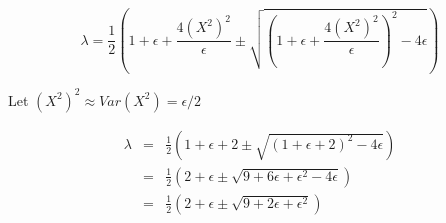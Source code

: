 \documentclass[12pt]{article}
\begin{document}
\begin{equation}
\lambda = \frac{1}{2} \left( 1 + \epsilon + \frac{4 \left( X^2 \right)^2}{\epsilon}  \pm \sqrt{\left( 1 + \epsilon + \frac{4 \left( X^2 \right)^2}{\epsilon} \right)^2 - 4 \epsilon}\right)
\end{equation}

Let $(X^2) ^2 \approx Var(X^2) = \epsilon/2$

\begin{eqnarray}
\lambda &=& 
\frac{1}{2} \left( 1 + \epsilon + 2  \pm \sqrt{\left( 1 + \epsilon + 2 \right)^2 - 4 \epsilon}\right) \\
&=& \frac{1}{2} \left( 2 + \epsilon \pm \sqrt{ 9 + 6 \epsilon + \epsilon^2 - 4 \epsilon}\right) \\
&=& \frac{1}{2} \left( 2 + \epsilon \pm \sqrt{ 9 + 2 \epsilon + \epsilon^2}\right)
\end{eqnarray}
\end{document}
